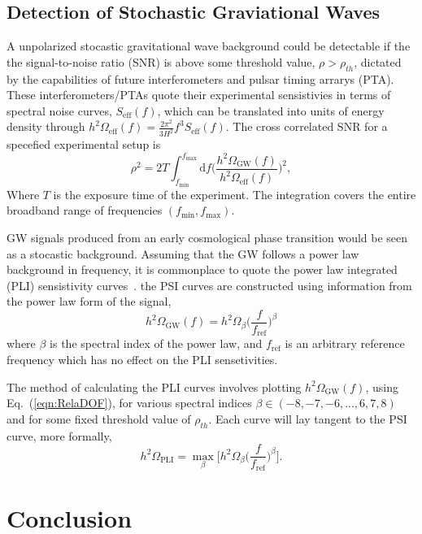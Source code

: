 \documentclass[nofootinbib,twocolumn,preprintnumbers]{revtex4-1}
\begin{document}
\subsection{Detection of Stochastic Graviational Waves}

A unpolarized stocastic gravitational wave background could be detectable if the the signal-to-noise ratio (SNR) is above some threshold value, $\rho > \rho_{th}$, dictated by the capabilities of future interferometers and pulsar timing arrarys (PTA). These interferometers/PTAs quote their experimental sensistivies in terms of spectral noise curves, $S_{\textrm{eff}}(f)$, which can be translated into units of energy density through $h^2 \Omega_{\textrm{eff}}(f) = \frac{2\pi^2}{3H^2}f^3 S_{\textrm{eff}}(f)$. The cross correlated SNR for a specefied experimental setup is~\cite{}
\begin{equation}\label{eqn::SNR}
\rho^2 = 2 T \int_{f_{\textrm{min}}}^{f_{\textrm{max}}}\textrm{d}f \bigg( \frac{h^2 \Omega_{\textrm{GW}}(f)}{h^2 \Omega_{\textrm{eff}}(f)} \bigg)^2,
\end{equation}
Where $T$ is the exposure time of the experiment. The integration covers the entire broadband range of frequencies $(f_{\textrm{min}}, f_{\textrm{max}})$. 


GW signals produced from an early cosmological phase transition would be seen as a stocastic background. Assuming that the GW follows a power law background in frequency, it is commonplace to quote the power law integrated (PLI) sensistivity curves~\cite{}. the PSI curves are constructed using information from the power law form of the signal,
\begin{equation}
h^2 \Omega_{\textrm{GW}}(f) = h^2 \Omega_{\beta}  \bigg(\frac{f}{f_{\textrm{ref}}}\bigg)^{\beta}
\end{equation}
where $\beta$ is the spectral index of the power law, and $f_{\textrm{ref}}$ is an arbitrary reference frequency which has no effect on the PLI sensetivities. 

The method of calculating the PLI curves involves plotting $h^2 \Omega_{\textrm{GW}}(f) $, using Eq.~(\ref{eqn:RelaDOF}), for various spectral indices $\beta \in (-8,-7,-6, ... , 6, 7, 8)$ and for some fixed threshold value of $\rho_{th}$. Each curve will lay tangent to the PSI curve, more formally,
\begin{equation}
h^2 \Omega_{\textrm{PLI}} = \max\limits_{\beta}\bigg[ h^2 \Omega_{\beta}\bigg(\frac{f}{f_{\textrm{ref}}}\bigg)^{\beta}  \bigg].
\end{equation}


\section{Conclusion}
\label{sec:conclusion}


\appendix



\end{document}
